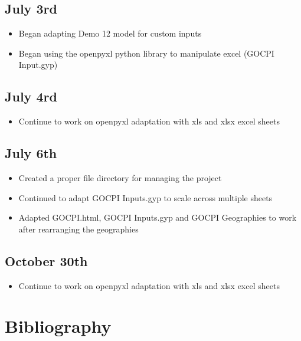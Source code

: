 \documentclass[12pt]{article}
\begin{document}
\subsection{July 3rd}
\begin{itemize}
	\item Began adapting Demo 12 model for custom inputs
	\item Began using the openpyxl python library to manipulate excel (GOCPI Input.gyp)
\end{itemize}
\subsection{July 4rd}
\begin{itemize}
	\item Continue to work on openpyxl adaptation with xls and xlsx excel sheets
\end{itemize}
\subsection{July 6th}
\begin{itemize}
	\item Created a proper file directory for managing the project
	\item Continued to adapt GOCPI Inputs.gyp to scale across multiple sheets
	\item Adapted GOCPI.html, GOCPI Inputs.gyp and GOCPI Geographies to work after rearranging the geographies
\end{itemize}
\subsection{October 30th}
\begin{itemize}
	\item Continue to work on openpyxl adaptation with xls and xlsx excel sheets
\end{itemize}
\section{Bibliography}
\printbibliography
\end{document}
